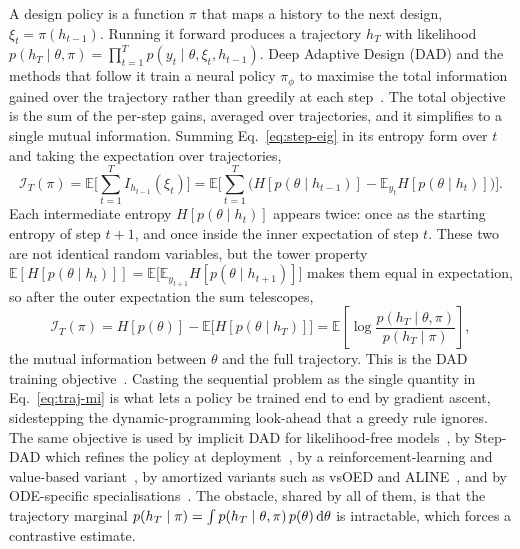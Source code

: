 A design policy is a function $\pi$ that maps a history to the next design,
$\xi_t=\pi(h_{t-1})$. Running it forward produces a trajectory $h_T$ with likelihood
$p(h_T\mid\theta,\pi)=\prod_{t=1}^{T}p(y_t\mid\theta,\xi_t,h_{t-1})$. Deep Adaptive
Design (DAD) and the methods that follow it train a neural policy $\pi_\phi$ to
maximise the total information gained over the trajectory rather than greedily at
each step~\citep{foster2021deep,ivanova2021implicit}. The total objective is the sum
of the per-step gains, averaged over trajectories, and it simplifies to a single
mutual information. Summing Eq.~\eqref{eq:step-eig} in its entropy form over $t$ and
taking the expectation over trajectories,
\begin{equation}
\label{eq:traj-sum}
\mathcal{I}_T(\pi)=\mathbb{E}\!\Big[\sum_{t=1}^{T} I_{h_{t-1}}(\xi_t)\Big]
=\mathbb{E}\!\Big[\sum_{t=1}^{T}\big(H[p(\theta\mid h_{t-1})]-\mathbb{E}_{y_t}H[p(\theta\mid h_t)]\big)\Big].
\end{equation}
Each intermediate entropy $H[p(\theta\mid h_t)]$ appears twice: once as the starting
entropy of step $t{+}1$, and once inside the inner expectation of step $t$. These two
are not identical random variables, but the tower property
$\mathbb{E}[H[p(\theta\mid h_t)]]=\mathbb{E}\big[\mathbb{E}_{y_{t+1}}H[p(\theta\mid h_{t+1})]\big]$
makes them equal in expectation, so after the outer expectation the sum telescopes,
\begin{equation}
\label{eq:traj-mi}
\mathcal{I}_T(\pi)=H[p(\theta)]-\mathbb{E}\big[H[p(\theta\mid h_T)]\big]
=\mathbb{E}\!\left[\log\frac{p(h_T\mid\theta,\pi)}{p(h_T\mid\pi)}\right],
\end{equation}
the mutual information between $\theta$ and the full trajectory. This is the DAD
training objective~\citep[Theorem~1]{foster2021deep}. Casting the sequential problem
as the single quantity in Eq.~\eqref{eq:traj-mi} is what lets a policy be trained
end to end by gradient ascent, sidestepping the dynamic-programming look-ahead that a
greedy rule ignores. The same objective is used by implicit DAD for likelihood-free
models~\citep{ivanova2021implicit}, by Step-DAD which refines the policy at
deployment~\citep{hedman2025stepdad}, by a reinforcement-learning and value-based
variant~\citep{blau2022optimizing}, by amortized variants
such as vsOED and ALINE~\citep{shen2025vsoed,huang2024amortized,huang2025aline,bracher2025jadai},
and by ODE-specific specialisations~\citep{strouwen2026deep,foster2020unified}. The
obstacle, shared by all of them, is that the trajectory marginal
$p(h_T\mid\pi)=\int p(h_T\mid\theta,\pi)\,p(\theta)\,\mathrm{d}\theta$ is intractable, which
forces a contrastive estimate.

